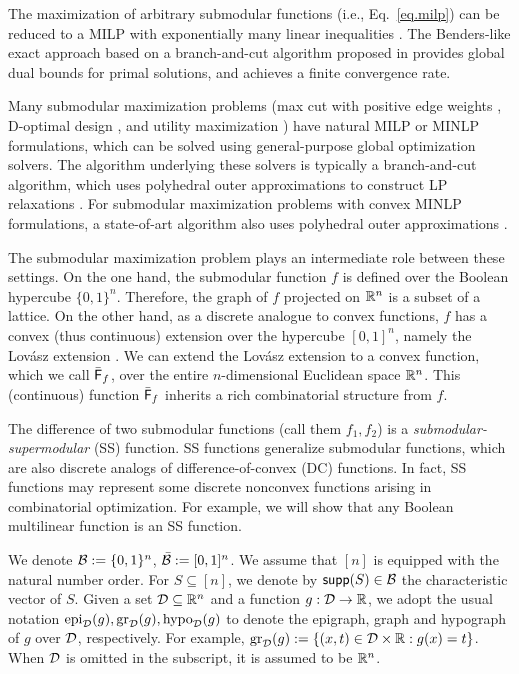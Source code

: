 The maximization of arbitrary submodular functions (i.e., Eq.~\eqref{eq.milp}) can be reduced to a MILP with exponentially many linear inequalities \cite{nemhauser1978analysis}.  The Benders-like exact approach based on a branch-and-cut algorithm proposed in  \cite{coniglio2022submodular} provides  global dual bounds for primal solutions, and achieves a finite convergence rate.

 Many submodular maximization problems  (\eg max cut with positive edge weights \cite{schrijver2003combinatorial}, D-optimal design \cite{sagnol2015computing}, and utility maximization \cite{ahmed2011maximizing}) have natural MILP or MINLP formulations, which can be solved using general-purpose global optimization solvers. The algorithm underlying these solvers is typically a branch-and-cut algorithm, which uses polyhedral outer approximations to construct LP relaxations \cite{bestuzheva2021scip,bestuzheva2023global,tawarmalani2005polyhedral}. For submodular maximization problems with  convex MINLP formulations,  a state-of-art algorithm also  uses  polyhedral outer approximations \cite{coey2020outer}.
 



The submodular maximization problem plays an intermediate role between these settings. On the one hand, the submodular function $f$ is defined over the Boolean hypercube $\{0,1\}^n$. Therefore,  the graph of $f$  projected on $\mathbb R^n$ is  a subset of a lattice. On the other hand, as a discrete  analogue to convex functions, $f$ has a convex (thus continuous) extension over the hypercube $[0,1]^n$, namely the  Lovász extension \cite{lovasz1983submodular}. We can extend the Lovász extension to  a convex function, which we call $\bar{\mathsf F}_{f}$, over the entire $n$-dimensional Euclidean space $\mathbb R^n$. This (continuous) function $\bar{\mathsf F}_{f}$ inherits a rich combinatorial structure from $f$.


The difference of two submodular functions (call them $f_1,f_2$) is a \textit{submodular-supermodular} (SS) function. SS functions generalize submodular functions, which are also discrete analogs of  difference-of-convex (DC) functions.  In fact,  SS functions may represent some discrete nonconvex functions arising in combinatorial optimization. For example, we will show that any Boolean multilinear function is an SS function.

We denote $\mathcal B := \{0,1\}^n$, $\bar{\mathcal B}: = [0,1]^n$. We assume that $[n]$ is equipped with the natural number order.
For $S \subseteq [n]$, we denote by $\mathsf{supp}(S) \in \mathcal B$ the characteristic vector of $S$. Given a set $\mathcal D \subseteq \mathbb R^n$ and a function $g: \mathcal D \to \mathbb R$, we adopt the usual notation $\operatorname{epi}_{\mathcal D}(g), \operatorname{gr}_{\mathcal D}(g), \operatorname{hypo}_{\mathcal D}(g)$ to denote the epigraph, graph and hypograph of $g$ over $\mathcal D$, respectively. For example, $\operatorname{gr}_{\mathcal D}(g) := \{(x,t) \in\mathcal D \times \mathbb R: g(x) = t\}$. When  $\mathcal D$ is omitted in the subscript, it is assumed to be $\mathbb R^n$.



